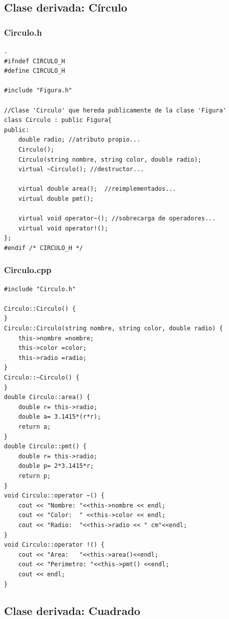 \documentclass[11pt]{article}
\begin{document}
\subsection{Clase derivada: Círculo}
\subsubsection*{Circulo.h}
\begin{lstlisting}.
#ifndef CIRCULO_H
#define CIRCULO_H

#include "Figura.h"

//Clase 'Circulo' que hereda publicamente de la clase 'Figura'
class Circulo : public Figura{
public:
	double radio; //atributo propio...
	Circulo();
	Circulo(string nombre, string color, double radio);
	virtual ~Circulo(); //destructor...
	
	virtual double area(); 	//reimplementados...
	virtual double pmt();
	
	virtual void operator~(); //sobrecarga de operadores...
	virtual void operator!();
};
#endif /* CIRCULO_H */	
\end{lstlisting}
\vspace{1 em}
\subsubsection*{Circulo.cpp}
\begin{lstlisting}
#include "Circulo.h"

Circulo::Circulo() {		
}
Circulo::Circulo(string nombre, string color, double radio) {
	this->nombre =nombre;
	this->color =color;
	this->radio =radio;
}
Circulo::~Circulo() {
}
double Circulo::area() {
	double r= this->radio;
	double a= 3.1415*(r*r);
	return a;
}
double Circulo::pmt() {
	double r= this->radio;
	double p= 2*3.1415*r;
	return p;
}
void Circulo::operator ~() {
	cout << "Nombre: "<<this->nombre << endl;
	cout << "Color:  " <<this->color << endl;
	cout << "Radio:  "<<this->radio << " cm"<<endl;
}
void Circulo::operator !() { 
	cout << "Area:   "<<this->area()<<endl;
	cout << "Perimetro: "<<this->pmt() <<endl;
	cout << endl;
}
\end{lstlisting}
\vspace{2 em}

\subsection{Clase derivada: Cuadrado}
\end{document}
